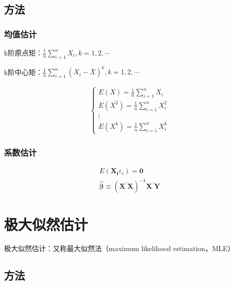 \documentclass[12pt]{book}
\begin{document}
\subsection{方法}

\subsubsection{均值估计}

\par k阶原点矩：$\frac{1}{n}\sum_{i=1}^{n}{X_i}, k=1,2,\cdots$
\par k阶中心矩：$\frac{1}{n}\sum_{i=1}^{n}{(X_i-\overline{X})^k}, k=1,2,\cdots$

\begin{gather*}
    \begin{cases}
        E(X) = \frac{1}{n}\sum_{i=1}^{n}{X_i}     \\
        E(X^2) = \frac{1}{n}\sum_{i=1}^{n}{X_i^2} \\
        \vdots                                    \\
        E(X^k) = \frac{1}{n}\sum_{i=1}^{n}{X_i^k}
    \end{cases}
\end{gather*}

\subsubsection{系数估计}

\begin{gather*}
    E( \mathbf{X_i} \varepsilon_{i} ) =\mathbf{0} \\
    \hat{\bm{\beta}} \equiv  (\mathbf{X}^{\prime}\mathbf{X})^{-1} \mathbf{X}^{\prime} \mathbf{Y}
\end{gather*}










\section{极大似然估计}







极大似然估计：又称最大似然法（maximum likelihood estimation，MLE）

\subsection{方法}
\end{document}
